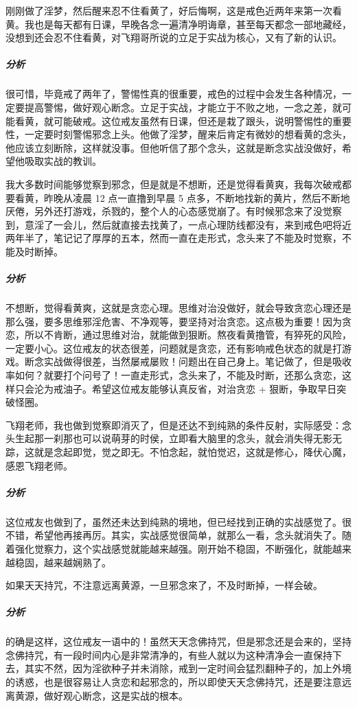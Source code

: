 \begin{case}
    刚刚做了淫梦，然后醒来忍不住看黄了，好后悔啊，这是戒色近两年来第一次看黄。我也是每天都有日课，早晚各念一遍清净明诲章，甚至每天都念一部地藏经，没想到还会忍不住看黄，对飞翔哥所说的立足于实战为核心，又有了新的认识。
    \subparagraph{分析} 很可惜，毕竟戒了两年了，警惕性真的很重要，戒色的过程中会发生各种情况，一定要提高警惕，做好观心断念。立足于实战，才能立于不败之地，一念之差，就可能看黄，就可能破戒。这位戒友虽然有日课，但还是栽了跟头，说明警惕性的重要性，一定要时刻警惕邪念上头。他做了淫梦，醒来后肯定有微妙的想看黄的念头，他应该立刻断除，这样就没事。但他听信了那个念头，这就是断念实战没做好，希望他吸取实战的教训。
\end{case}

\begin{case}
    我大多数时间能够觉察到邪念，但是就是不想断，还是觉得看黄爽，我每次破戒都要看黄，昨晚从凌晨 12 点一直撸到早晨 5 点多，不断地找新的黄片，然后不断地厌倦，另外还打游戏，杀戮的，整个人的心态感觉崩了。有时候邪念来了没觉察到，意淫了一会儿，然后就直接去找黄了，一点心理防线都没有，来到戒色吧将近两年半了，笔记记了厚厚的五本，然而一直在走形式，念头来了不能及时觉察，不能及时断掉。
    \subparagraph{分析} 不想断，觉得看黄爽，这就是贪恋心理。思维对治没做好，就会导致贪恋心理还是那么强，要多思维邪淫危害、不净观等，要坚持对治贪恋。这点极为重要！因为贪恋，所以不肯断，通过思维对治，就能做到狠断。熬夜看黄撸管，有猝死的风险，一定要小心。这位戒友的状态很差，问题就是贪恋，还有影响戒色状态的就是打游戏。断念实战做得很差，当然屡戒屡败！问题出在自己身上。笔记做了，但是吸收率如何？就要打个问号了！一直走形式，念头来了，不能及时断，还那么贪恋，这样只会沦为戒油子。希望这位戒友能够认真反省，对治贪恋 + 狠断，争取早日突破怪圈。
\end{case}

\begin{case}
    飞翔老师，我也做到觉察即消灭了，但是还达不到纯熟的条件反射，实际感受：念头生起那一刹那也可以说萌芽的时侯，立即看大脑里的念头，就会消失得无影无踪，这就是念起即觉，觉之即无。不怕念起，就怕觉迟，这就是修心，降伏心魔，感恩飞翔老师。
    \subparagraph{分析} 这位戒友也做到了，虽然还未达到纯熟的境地，但已经找到正确的实战感觉了。很不错，希望他再接再厉。其实，实战感觉很简单，就那么一看，念头就消失了。随着强化觉察力，这个实战感觉就能越来越强。刚开始不稳固，不断强化，就能越来越稳固，越来越娴熟了。
\end{case}

\begin{case}
    如果天天持咒，不注意远离黄源，一旦邪念來了，不及时断掉，一样会破。
    \subparagraph{分析} 的确是这样，这位戒友一语中的！虽然天天念佛持咒，但是邪念还是会来的，坚持念佛持咒，有一段时间内心是非常清净的，有些人就以为这种清净会一直保持下去，其实不然，因为淫欲种子并未消除，戒到一定时间会猛烈翻种子的，加上外境的诱惑，也是很容易让人贪恋和起邪念的，所以即使天天念佛持咒，还是要注意远离黄源，做好观心断念，这是实战的根本。
\end{case}


